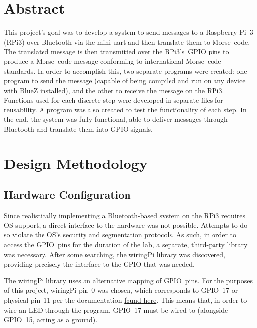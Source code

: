 \documentclass[11pt]{article}
\begin{document}


\section{Abstract}
\label{sec:abstract}


This project's goal was to develop a system to send messages to a Raspberry Pi~3 (RPi3) over Bluetooth via the mini uart and then translate them to Morse~code.
The translated message is then transmitted over the RPi3's~GPIO pins to produce a Morse~code message conforming to international Morse~code standards.
In order to accomplish this, two separate programs were created: one program to send the message (capable of being compiled and run on any device with BlueZ installed), and the other to receive the message on the RPi3.
Functions used for each discrete step were developed in separate files for reusability.
A program was also created to test the functionality of each step.
In the end, the system was fully-functional, able to deliver messages through Bluetooth and translate them into GPIO signals.


\section{Design Methodology}
\label{sec:design_methodology}




\subsection{Hardware Configuration}
\label{sub:hardware_configuration}


Since realistically implementing a Bluetooth-based system on the RPi3 requires OS support, a direct interface to the hardware was not possible.
Attempts to do so violate the OS's security and segmentation protocols.
As such, in order to access the GPIO~pins for the duration of the lab, a separate, third-party library was necessary.
After some searching, the \href{http://wiringpi.com/}{wiringPi} library was discovered, providing precisely the interface to the GPIO that was needed.


The wiringPi library uses an alternative mapping of GPIO~pins.
For the purposes of this project, wiringPi pin~0 was chosen, which corresponds to GPIO~17 or physical pin~11 per the documentation \href{http://wiringpi.com/pins/}{found here}.
This means that, in order to wire an LED through the program, GPIO~17 must be wired to (alongside GPIO~15, acting as a ground).
\end{document}

